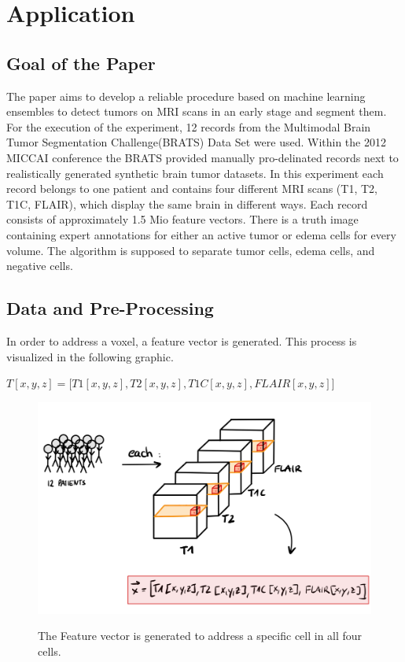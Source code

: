\documentclass[
12pt,
headsepline,
bibliography=totoc,
twoside=semi,
]{scrartcl}
\begin{document}
\section{Application\label{sec:sec3}}

 \subsection{Goal of the Paper\label{sec:sec3-1}}
 The paper aims to develop a reliable procedure based on machine learning ensembles to detect tumors on MRI scans in an early stage and segment them. For the execution of the experiment, 12 records from the Multimodal Brain Tumor Segmentation Challenge(BRATS) Data Set were used. Within the 2012 MICCAI conference the BRATS provided manually pro-delinated records next to realistically generated synthetic brain tumor datasets. In this experiment each record belongs to one patient and contains four different MRI scans (T1, T2, T1C, FLAIR), which display the same brain in different ways. Each record consists of approximately 1.5 Mio feature vectors. There is a truth image containing expert annotations for either an active tumor or edema cells for every volume. The algorithm is supposed to separate tumor cells, edema cells, and negative cells.

 \subsection{Data and Pre-Processing\label{sec:sec3-2}}
 In order to address a voxel, a feature vector is generated. This process is visualized in the following graphic.\\
 
 \begin{center} $T[x,y,z] = \biggl[T1[x,y,z], T2[x,y,z], T1C[x,y,z], FLAIR[x,y,z]\biggr]$\end{center}

 \begin{figure}[H]
 \centering \includegraphics[scale=0.5]{BDT14.png}\label{fig:fig14}
 \caption{The Feature vector is generated to address a specific cell in all four cells.}
 \end{figure}
\end{document}
